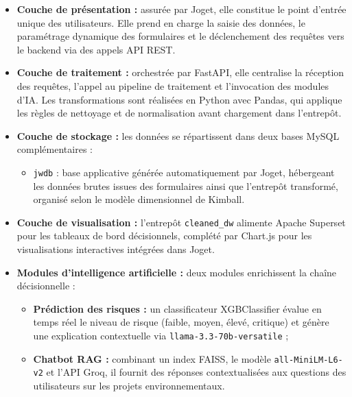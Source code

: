 \begin{itemize}

    \item \textbf{Couche de présentation :} assurée par Joget,
    elle constitue le point d'entrée unique des utilisateurs.
    Elle prend en charge la saisie des données, le paramétrage
    dynamique des formulaires et le déclenchement des requêtes vers
    le backend via des appels API REST.

    \item \textbf{Couche de traitement :} orchestrée par FastAPI,
    elle centralise la réception des requêtes, l'appel au pipeline
    de traitement et l'invocation des modules d'IA. Les
    transformations sont réalisées en Python avec Pandas, qui
    applique les règles de nettoyage et de normalisation avant
    chargement dans l'entrepôt.

    \item \textbf{Couche de stockage :} les données se répartissent
    dans deux bases MySQL complémentaires :
    \begin{itemize}
        \item \texttt{jwdb} : base applicative générée
        automatiquement par Joget, hébergeant les données brutes
        issues des formulaires ainsi que l'entrepôt transformé,
        organisé selon le modèle dimensionnel de Kimball.
    \end{itemize}

    \item \textbf{Couche de visualisation :} l'entrepôt
    \texttt{cleaned\_dw} alimente Apache Superset pour les tableaux
    de bord décisionnels, complété par Chart.js pour les
    visualisations interactives intégrées dans Joget.

    \item \textbf{Modules d'intelligence artificielle :} deux
    modules enrichissent la chaîne décisionnelle :
    \begin{itemize}
        \item \textbf{Prédiction des risques :} un classificateur
        XGBClassifier évalue en temps réel le niveau de risque
        (faible, moyen, élevé, critique) et génère une explication
        contextuelle via \texttt{llama-3.3-70b-versatile} ;
        \item \textbf{Chatbot RAG :} combinant un index FAISS,
        le modèle \texttt{all-MiniLM-L6-v2} et l'API Groq, il
        fournit des réponses contextualisées aux questions des
        utilisateurs sur les projets environnementaux.
    \end{itemize}

\end{itemize}


